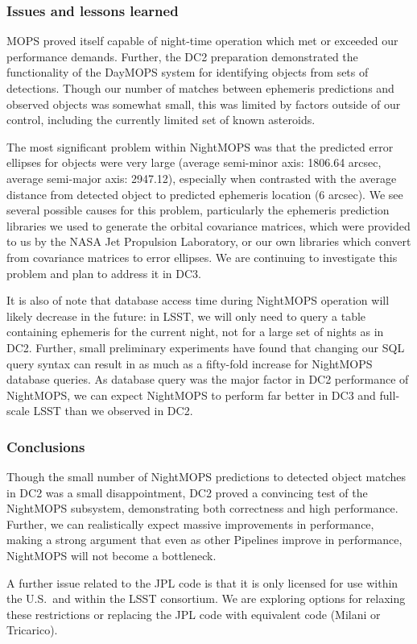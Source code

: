
\subsubsection{Issues and lessons learned}

MOPS proved itself capable of night-time operation which met or
exceeded our performance demands.  Further, the DC2 preparation
demonstrated the functionality of the DayMOPS system for identifying
objects from sets of detections.  Though our number of matches between
ephemeris predictions and observed objects was somewhat small, this
was limited by factors outside of our control, including the currently
limited set of known asteroids.

The most significant problem within NightMOPS was that the predicted
error ellipses for objects were very large (average semi-minor axis:
1806.64 arcsec, average semi-major axis: 2947.12), especially when
contrasted with the average distance from detected object to predicted
ephemeris location (6 arcsec).  We see several possible causes for
this problem, particularly the ephemeris prediction libraries we used
to generate the orbital covariance matrices, which were provided to us
by the NASA Jet Propulsion Laboratory, or our own libraries which
convert from covariance matrices to error ellipses.  We are continuing
to investigate this problem and plan to address it in DC3.


It is also of note that database access time during NightMOPS
operation will likely decrease in the future: in LSST, we will only
need to query a table containing ephemeris for the current night, not
for a large set of nights as in DC2.  Further, small preliminary
experiments have found that changing our SQL query syntax can result
in as much as a fifty-fold increase for NightMOPS database queries.
As database query was the major factor in DC2 performance of
NightMOPS, we can expect NightMOPS to perform far better in DC3 and
full-scale LSST than we observed in DC2.

\subsubsection{Conclusions}
Though the small number of NightMOPS predictions to detected object
matches in DC2 was a small disappointment, DC2 proved a convincing
test of the NightMOPS subsystem, demonstrating both correctness and
high performance.  Further, we can realistically expect massive
improvements in performance, making a strong argument that even as
other Pipelines improve in performance, NightMOPS will not become a
bottleneck.

A further issue related to the JPL code is that it is only licensed
for use within the U.S.~and within the LSST consortium. We are 
exploring options for relaxing these restrictions or replacing
the JPL code with equivalent code (Milani or Tricarico).
